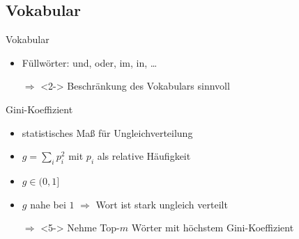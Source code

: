 \subsection{Vokabular}
\begin{frame}{Vokabular}
    \begin{itemize}
        \item<1-> Füllwörter: und, oder, im, in, \dots
        \item[$\Rightarrow$]<2-> Beschränkung des Vokabulars sinnvoll
    \end{itemize}

\end{frame}

\begin{frame}{Gini-Koeffizient}
    \begin{itemize}
        \item<1-> statistisches Maß für Ungleichverteilung
        \item<2-> $g = \sum_i p_i^2$ mit $p_i$ als relative Häufigkeit
        \item<3-> $g \in (0, 1]$
        \item<4-> $g$ nahe bei $1$ $\Rightarrow$ Wort ist stark ungleich verteilt
        \item[$\Rightarrow$]<5-> Nehme Top-$m$ Wörter mit höchstem
                  Gini-Koeffizient
    \end{itemize}
\end{frame}

